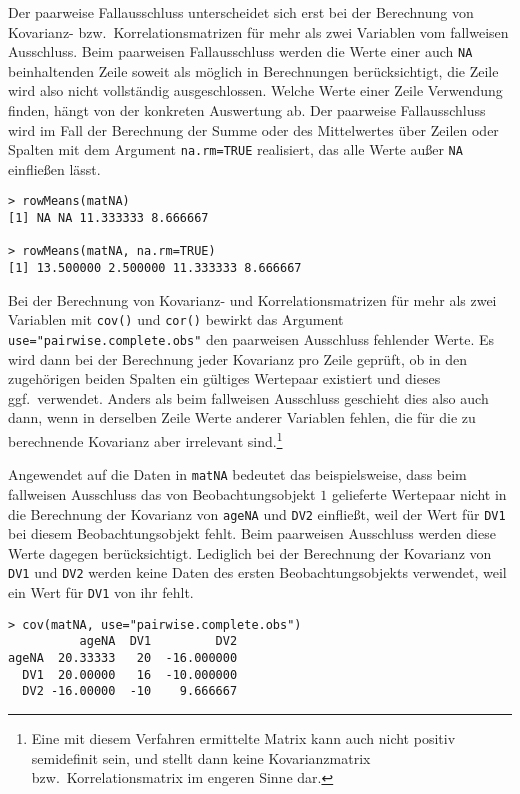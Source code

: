 Der paarweise Fallausschluss unterscheidet sich erst bei der Berechnung von Kovarianz- bzw.\ Korrelationsmatrizen für mehr als zwei Variablen vom fallweisen Ausschluss. Beim paarweisen Fallausschluss werden die Werte einer auch \lstinline!NA! beinhaltenden Zeile soweit als möglich in Berechnungen berücksichtigt, die Zeile wird also nicht vollständig ausgeschlossen. Welche Werte einer Zeile Verwendung finden, hängt von der konkreten Auswertung ab. Der paarweise Fallausschluss wird im Fall der Berechnung der Summe oder des Mittelwertes über Zeilen oder Spalten mit dem Argument \lstinline!na.rm=TRUE! realisiert, das alle Werte außer \lstinline!NA! einfließen lässt.
\begin{lstlisting}
> rowMeans(matNA)
[1] NA NA 11.333333 8.666667

> rowMeans(matNA, na.rm=TRUE)
[1] 13.500000 2.500000 11.333333 8.666667
\end{lstlisting}

Bei der Berechnung von Kovarianz- und Korrelationsmatrizen für mehr als zwei Variablen mit \lstinline!cov()! und \lstinline!cor()! bewirkt das Argument \lstinline!use="pairwise.complete.obs"! den paarweisen Ausschluss fehlender Werte. Es wird dann bei der Berechnung jeder Kovarianz pro Zeile geprüft, ob in den zugehörigen beiden Spalten ein gültiges Wertepaar existiert und dieses ggf.\ verwendet. Anders als beim fallweisen Ausschluss geschieht dies also auch dann, wenn in derselben Zeile Werte anderer Variablen fehlen, die für die zu berechnende Kovarianz aber irrelevant sind.\footnote{Eine mit diesem Verfahren ermittelte Matrix kann auch nicht positiv semidefinit sein, und stellt dann keine Kovarianzmatrix bzw.\ Korrelationsmatrix im engeren Sinne dar.}

Angewendet auf die Daten in \lstinline!matNA! bedeutet das beispielsweise, dass beim fallweisen Ausschluss das von Beobachtungsobjekt $1$ gelieferte Wertepaar nicht in die Berechnung der Kovarianz von \lstinline!ageNA! und \lstinline!DV2! einfließt, weil der Wert für \lstinline!DV1! bei diesem Beobachtungsobjekt fehlt. Beim paarweisen Ausschluss werden diese Werte dagegen berücksichtigt. Lediglich bei der Berechnung der Kovarianz von \lstinline!DV1! und \lstinline!DV2! werden keine Daten des ersten Beobachtungsobjekts verwendet, weil ein Wert für \lstinline!DV1! von ihr fehlt.
\begin{lstlisting}
> cov(matNA, use="pairwise.complete.obs")
          ageNA  DV1         DV2
ageNA  20.33333   20  -16.000000
  DV1  20.00000   16  -10.000000
  DV2 -16.00000  -10    9.666667
\end{lstlisting}

